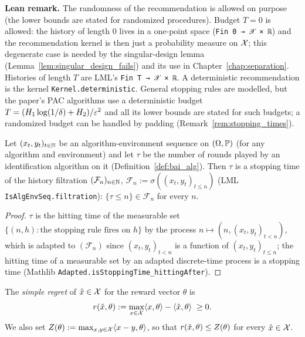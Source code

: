 \textbf{Lean remark.} The randomness of the recommendation is allowed on purpose (the lower
bounds are stated for randomized procedures). Budget $T = 0$ is allowed: the history of length
$0$ lives in a one-point space (\texttt{Fin 0 → 𝒳 × ℝ}) and the recommendation kernel is then
just a probability measure on $\mathcal{X}$; this degenerate case is needed by the singular-design lemma
(Lemma~\ref{lem:singular_design_fails}) and its use in Chapter~\ref{chap:separation}. Histories
of length $T$ are LML's \texttt{Fin T → 𝒳 × ℝ}. A deterministic recommendation is the kernel
\texttt{Kernel.deterministic}. General stopping rules are modelled, but the paper's PAC
algorithms use a deterministic budget $T = (H_1 \log(1/\delta) + H_2)/\varepsilon^2$ and all its lower
bounds are stated for such budgets; a randomized budget can be handled by padding
(Remark~\ref{rem:stopping_times}).

\begin{lemma}\label{lem:stopping_time}
\leanok
{}
Let $(x_t, y_t)_{t\in\mathbb{N}}$ be an algorithm-environment sequence on $(\Omega,\mathbb{P})$ (for any
algorithm and environment) and let $\tau$ be the number of rounds played by an identification
algorithm on it (Definition~\ref{def:bai_alg}). Then $\tau$ is a stopping time of the history
filtration $(\mathcal F_n)_{n\in\mathbb{N}}$, $\mathcal F_n := \sigma((x_t,y_t)_{t\le n})$ (LML
\texttt{IsAlgEnvSeq.filtration}): $\{\tau \le n\} \in \mathcal F_n$ for every $n$.
\end{lemma}
\begin{proof}
\leanok
$\tau$ is the hitting time of the measurable set $\{(n, h) : \text{the stopping rule fires on } h\}$
by the process $n \mapsto (n, (x_t,y_t)_{t<n})$, which is adapted to $(\mathcal F_n)$ since
$(x_t,y_t)_{t<n}$ is a function of $(x_t,y_t)_{t\le n}$; the hitting time of a measurable set by an
adapted discrete-time process is a stopping time (Mathlib
\texttt{Adapted.isStoppingTime\_hittingAfter}).
\end{proof}

\begin{definition}\label{def:regret}
\leanok
{}
The \emph{simple regret} of $\hat{x} \in \mathcal{X}$ for the reward vector $\theta$ is
\[
  r(\hat{x}, \theta) := \max_{x \in \mathcal{X}} \langle x, \theta \rangle - \langle \hat{x}, \theta \rangle \;\ge 0 .
\]
We also set $Z(\theta) := \max_{x, y \in \mathcal{X}} \langle x - y, \theta \rangle$, so that
$r(\hat{x},\theta) \le Z(\theta)$ for every $\hat{x} \in \mathcal{X}$.
\end{definition}

